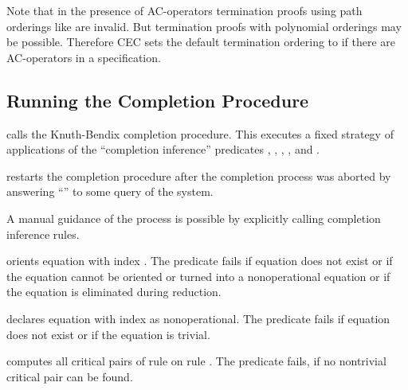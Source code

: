Note that in the presence of AC-operators termination proofs using path orderings
like  are invalid. But termination proofs with polynomial orderings may
be possible. Therefore CEC sets the default termination ordering
to  if there are AC-operators in a specification. 


\subsection{Running the Completion Procedure}

\begin{command}[\comName{c}]
calls the Knuth-Bendix completion procedure. This executes a fixed strategy of
applications of the ``completion inference'' predicates , 
, , ,  and
.
\end{command}

\begin{command}
restarts the completion procedure after the completion process was
aborted by answering ``'' to some query of the system.
\end{command}

\noindent
A manual guidance of the process is possible by explicitly calling
completion inference rules. \bigskip

\begin{command}
orients equation with index . The predicate fails if equation 
 does
not exist or if the equation cannot be oriented or turned into a nonoperational
equation or if the equation is eliminated during reduction.
\end{command}

\begin{command}
declares equation with index  as nonoperational. 
The predicate fails if equation  does not exist 
or if the equation is trivial.
\end{command}

\begin{command}
computes all critical pairs of rule  on rule 
. 
The predicate fails, if no nontrivial critical pair can be found.
\end{command}

